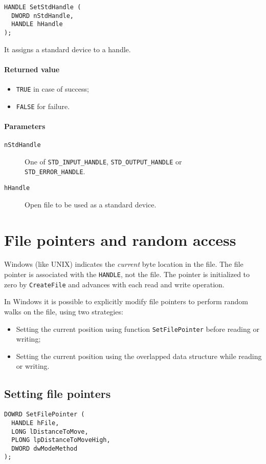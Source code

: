 \begin{verbatim}
HANDLE SetStdHandle (
  DWORD nStdHandle,
  HANDLE hHandle
);
\end{verbatim}

It assigns a standard device to a handle.

\paragraph{Returned value}
\begin{itemize}
\item \texttt{TRUE} in case of success;
\item \texttt{FALSE} for failure.
\end{itemize}

\paragraph{Parameters}
\begin{description}
\item [\texttt{nStdHandle}] One of \texttt{STD\_INPUT\_HANDLE}, \texttt{STD\_OUTPUT\_HANDLE} or \\ \texttt{STD\_ERROR\_HANDLE}.
\item [\texttt{hHandle}] Open file to be used as a standard device.
\end{description}

\section{File pointers and random access}
Windows (like UNIX) indicates the \emph{current} byte location in the file. The file pointer is associated with the \texttt{HANDLE}, not the file. The pointer is initialized to zero by \texttt{CreateFile} and advances with each read and write operation.

In Windows it is possible to explicitly modify file pointers to perform random walks on the file, using two strategies:
\begin{itemize}
\item Setting the current position using function \texttt{SetFilePointer} before reading or writing;
\item Setting the current position using the overlapped data structure while reading or writing.
\end{itemize}

\subsection{Setting file pointers}
\begin{verbatim}
DOWRD SetFilePointer (
  HANDLE hFile,
  LONG lDistanceToMove,
  PLONG lpDistanceToMoveHigh,
  DWORD dwModeMethod
);
\end{verbatim}

